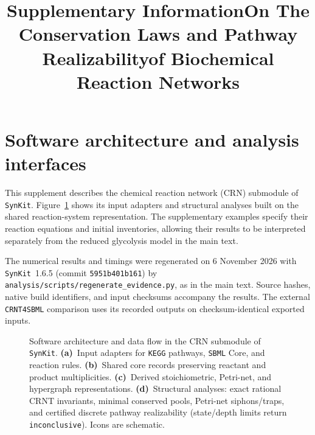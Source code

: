 \documentclass[pdflatex,referee]{../template/sn-jnl}
\theoremstyle{plain}%
\theoremstyle{definition}%
\theoremstyle{remark}%
\newcommand{\synkit}{\texttt{SynKit}\xspace}
\begin{document}
\title[Supplementary Information]{Supplementary Information\hb On The Conservation Laws and Pathway Realizability\hb of Biochemical Reaction Networks}


\author[1]{ }
\author*[1,2]{ }



\maketitle

\section{Software architecture and analysis interfaces}
\label{si:software}

This supplement describes the chemical reaction network (CRN) submodule of \synkit. Figure~\ref{fig:synkit_architecture} shows its input adapters and structural analyses built on the shared reaction-system representation. The supplementary examples specify their reaction equations and initial inventories, allowing their results to be interpreted separately from the reduced glycolysis model in the main text.

The numerical results and timings were regenerated on 6 November 2026 with \synkit~1.6.5 (commit \texttt{5951b401b161}) by \texttt{analysis/scripts/regenerate\_evidence.py}, as in the main text. Source hashes, native build identifiers, and input checksums accompany the results. The external \texttt{CRNT4SBML} comparison uses its recorded outputs on checksum-identical exported inputs.

\begin{figure}[!htbp]
    \centering
    \caption{Software architecture and data flow in the CRN submodule of \synkit. \textbf{(a)}~Input adapters for \texttt{KEGG} pathways, \texttt{SBML} Core, and reaction rules. \textbf{(b)}~Shared core records preserving reactant and product multiplicities. \textbf{(c)}~Derived stoichiometric, Petri-net, and hypergraph representations. \textbf{(d)}~Structural analyses: exact rational CRNT invariants, minimal conserved pools, Petri-net siphons/traps, and certified discrete pathway realizability (state/depth limits return \texttt{inconclusive}). Icons are schematic.}
    \label{fig:synkit_architecture}
\end{figure}
\end{document}
